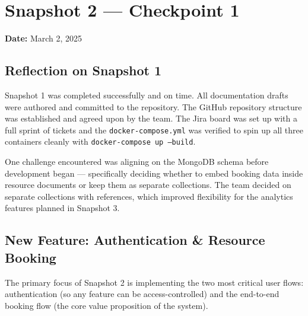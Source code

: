\documentclass[12pt]{article}
\begin{document}
\section{Snapshot 2 --- Checkpoint 1}
\textbf{Date:} March 2, 2025

\subsection{Reflection on Snapshot 1}
Snapshot 1 was completed successfully and on time. All documentation drafts were authored and committed to the repository. The GitHub repository structure was established and agreed upon by the team. The Jira board was set up with a full sprint of tickets and the \texttt{docker-compose.yml} was verified to spin up all three containers cleanly with \texttt{docker-compose up --build}.

One challenge encountered was aligning on the MongoDB schema before development began --- specifically deciding whether to embed booking data inside resource documents or keep them as separate collections. The team decided on separate collections with references, which improved flexibility for the analytics features planned in Snapshot 3.

\subsection{New Feature: Authentication \& Resource Booking}
The primary focus of Snapshot 2 is implementing the two most critical user flows: authentication (so any feature can be access-controlled) and the end-to-end booking flow (the core value proposition of the system).
\end{document}
